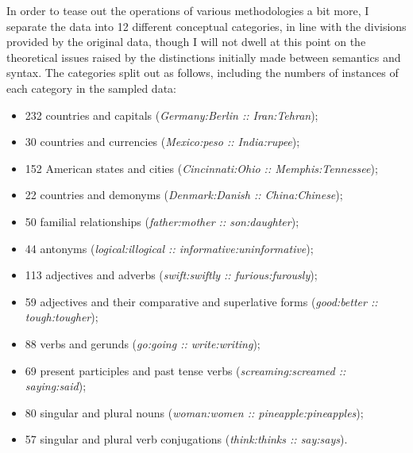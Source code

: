 In order to tease out the operations of various methodologies a bit more, I separate the data into 12 different conceptual categories, in line with the divisions provided by the original data, though I will not dwell at this point on the theoretical issues raised by the distinctions initially made between semantics and syntax.  The categories split out as follows, including the numbers of instances of each category in the sampled data:

\begin{itemize}[noitemsep]
\item[] 232 countries and capitals (\emph{Germany:Berlin :: Iran:Tehran});
\item[] 30 countries and currencies (\emph{Mexico:peso :: India:rupee});
\item[] 152 American states and cities (\emph{Cincinnati:Ohio :: Memphis:Tennessee});
\item[] 22 countries and demonyms (\emph{Denmark:Danish :: China:Chinese});
\item[] 50 familial relationships (\emph{father:mother :: son:daughter});
\item[] 44 antonyms (\emph{logical:illogical :: informative:uninformative});
\item[] 113 adjectives and adverbs (\emph{swift:swiftly :: furious:furously});
\item[] 59 adjectives and their comparative and superlative forms (\emph{good:better :: tough:tougher});
\item[] 88 verbs and gerunds (\emph{go:going :: write:writing});
\item[] 69 present participles and past tense verbs (\emph{screaming:screamed :: saying:said});
\item[] 80 singular and plural nouns (\emph{woman:women :: pineapple:pineapples});
\item[] 57 singular and plural verb conjugations (\emph{think:thinks :: say:says}).
\end{itemize}

